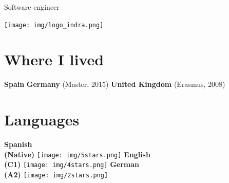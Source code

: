 \documentclass[]{friggeri-cv}
\begin{document}
\newtoggle{ES}
\newtoggle{EN}
\toggletrue{EN}
\togglefalse{ES}

\newtoggle{CO}
\newtoggle{SYS}
\newtoggle{SOFT}
\togglefalse{CO}
\togglefalse{SYS}
\toggletrue{SOFT}

\newtoggle{picture}
\toggletrue{picture}

{\iftoggle{ES}{Ingeniero software}{}
\iftoggle{EN}{Software engineer}{}}
\newline
\newline 
\newline
\newline 




\begin{aside} 
\vspace{1.25cm}
\texttt{[image: img/logo\_indra.png]}
    ~
    ~    
\section{\iftoggle{ES}{Paises de residencia}{}
\iftoggle{EN}{Where I lived}{}}
	\iftoggle{EN}{\textbf{Spain}}{}
    \iftoggle{ES}{\textbf{España}}{}
    \iftoggle{EN}{\textbf{Germany}}{}
    \iftoggle{ES}{\textbf{Alemania}}{}
    (Master, 2015)
    \iftoggle{EN}{\textbf{United Kingdom}}{}
    \iftoggle{ES}{\textbf{Reino Unido}}{}
    (Erasmus, 2008)
    ~
\section{\iftoggle{ES}{Idiomas}{}
\iftoggle{EN}{Languages}{}}
	\iftoggle{ES}{\textbf{Español\\ (Nativo)}}{}
	\iftoggle{EN}{\textbf{Spanish\\ (Native)}}{}
    \texttt{[image: img/5stars.png]}
    \iftoggle{ES}{\textbf{Inglés\\ (C1) }}{}
	\iftoggle{EN}{\textbf{English\\ (C1) }}{}
    \texttt{[image: img/4stars.png]}
    \iftoggle{ES}{\textbf{Alemán\\ (A2) }}{}
	\iftoggle{EN}{\textbf{German\\ (A2) }}{}
    \texttt{[image: img/2stars.png]}
\end{aside}


\end{document}
